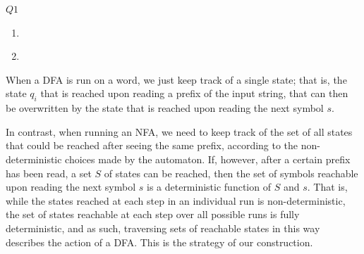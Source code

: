 \documentclass{article}
\theoremstyle{definition}
\theoremstyle{definition}
\theoremstyle{remark}
\begin{document}
\begin{questionbox}{$Q1$}
\begin{enumerate}
        \item[$(v)$]\hspace*{1cm}
        \begin{center}
        \end{center}
    
        \item[$(vi)$]\hspace*{1cm}
        \begin{center}
        \end{center}
    \end{enumerate}
\end{questionbox}

\bigskip

When a DFA is run on a word, we just keep track of a single state; that is, the state $q_i$ that is reached upon reading a prefix of the input string, that can then be overwritten by the state that is reached upon reading the next symbol $s$.

In contrast, when running an NFA, we need to keep track of the set of all states that could be reached after seeing the same prefix, according to the non-deterministic choices made by the automaton. If, however, after a certain prefix has been read, a set $S$ of states can be reached, then the set of symbols reachable upon reading the next symbol $s$ is a deterministic function of $S$ and $s$. That is, while the states reached at each step in an individual run is non-deterministic, the set of states reachable at each step over all possible runs is fully deterministic, and as such, traversing sets of reachable states in this way describes the action of a DFA. This is the strategy of our construction.
\end{document}
